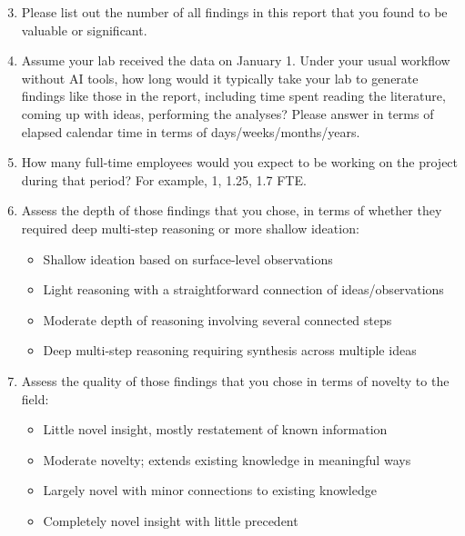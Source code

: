 \documentclass{article}
\begin{document}
\begin{enumerate}
    \setcounter{enumi}{2} %
    \item Please list out the number of all findings in this report that you found to be valuable or significant.
    
    \item Assume your lab received the data on January 1. Under your usual workflow without AI tools, how long would it typically take your lab to generate findings like those in the report, including time spent reading the literature, coming up with ideas, performing the analyses? Please answer in terms of elapsed calendar time in terms of days/weeks/months/years.
    
    \item How many full-time employees would you expect to be working on the project during that period? For example, 1, 1.25, 1.7 FTE.
    
    \item Assess the depth of those findings that you chose, in terms of whether they required deep multi-step reasoning or more shallow ideation:
    \begin{itemize}
        \item Shallow ideation based on surface-level observations
        \item Light reasoning with a straightforward connection of ideas/observations
        \item Moderate depth of reasoning involving several connected steps
        \item Deep multi-step reasoning requiring synthesis across multiple ideas
    \end{itemize}
    
    \item Assess the quality of those findings that you chose in terms of novelty to the field:
    \begin{itemize}
        \item Little novel insight, mostly restatement of known information
        \item Moderate novelty; extends existing knowledge in meaningful ways
        \item Largely novel with minor connections to existing knowledge
        \item Completely novel insight with little precedent
    \end{itemize}
\end{enumerate}
\end{document}
